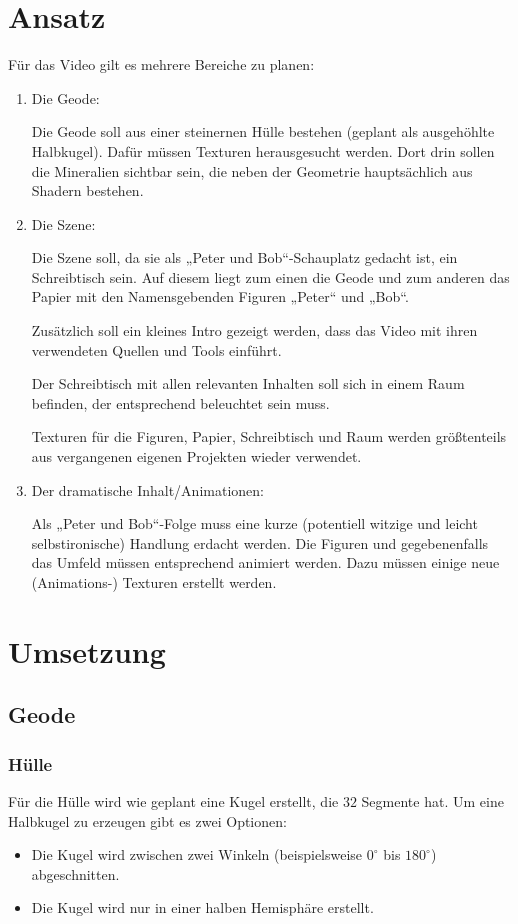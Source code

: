 \documentclass{scrreprt}
\begin{document}
\section{Ansatz}

Für das Video gilt es mehrere Bereiche zu planen:
\begin{enumerate}
\item Die Geode:

Die Geode soll aus einer steinernen Hülle bestehen (geplant als ausgehöhlte Halbkugel). Dafür müssen Texturen herausgesucht werden. Dort drin sollen die Mineralien sichtbar sein, die neben der Geometrie hauptsächlich aus Shadern bestehen.
\item Die Szene:

Die Szene soll, da sie als „Peter und Bob“-Schauplatz gedacht ist, ein Schreibtisch sein. Auf diesem liegt zum einen die Geode und zum anderen das Papier mit den Namensgebenden Figuren „Peter“ und „Bob“.

Zusätzlich soll ein kleines Intro gezeigt werden, dass das Video mit ihren verwendeten Quellen und Tools einführt.

Der Schreibtisch mit allen relevanten Inhalten soll sich in einem Raum befinden, der entsprechend beleuchtet sein muss.

Texturen für die Figuren, Papier, Schreibtisch und Raum werden größtenteils aus vergangenen eigenen Projekten wieder verwendet.
\item Der dramatische Inhalt/Animationen:

Als „Peter und Bob“-Folge muss eine kurze (potentiell witzige und leicht selbstironische) Handlung erdacht werden. Die Figuren und gegebenenfalls das Umfeld müssen entsprechend animiert werden. Dazu müssen einige neue (Animations-) Texturen erstellt werden.
\end{enumerate}

\section{Umsetzung}

\subsection{Geode}
\subsubsection{Hülle}

Für die Hülle wird wie geplant eine Kugel erstellt, die $32$ Segmente hat. Um eine Halbkugel zu erzeugen gibt es zwei Optionen:
\begin{itemize}
\item Die Kugel wird zwischen zwei Winkeln (beispielsweise $0^\circ$ bis $180^\circ$) abgeschnitten.
\item Die Kugel wird nur in einer halben Hemisphäre erstellt.
\end{itemize}
\end{document}
